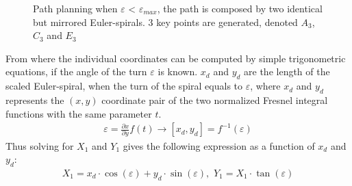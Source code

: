 \documentclass[a0,portrait]{a0poster}
\begin{document}
\begin{center}
{\begin{figure}
\begin{center}
		\caption{Path planning when $\varepsilon$ < $\varepsilon_{max}$, the path is composed by two identical but mirrored Euler-spirals. 3 key points are generated, denoted $A_3$, $C_3$ and $E_3$}
		\label{fig:3points}
	\end{center}
\end{figure}
From where the individual coordinates can be computed by simple trigonometric equations, if the angle of the turn $\varepsilon$ is known. $x_d$ and $y_d$ are the length of the scaled Euler-spiral, when the turn of the spiral equals to $\varepsilon$, where $x_d$ and $y_d$ represents the $(x,y)$ coordinate pair of the two normalized Fresnel integral functions with the same parameter $t$.
\begin{align}
\varepsilon = \frac{\partial x}{\partial y}f(t) \to [x_d,y_d] = f^{-1}(\varepsilon)
\end{align}
Thus solving for $X_1$ and $Y_1$ gives the following expression as a function of $x_d$ and $y_d$:
\begin{align}
X_1 = x_d \cdot \cos(\varepsilon) + y_d \cdot \sin(\varepsilon),\,\, Y_1 = X_1 \cdot \tan(\varepsilon)
\end{align}

}
\col{
}
\end{center}
\end{document}
